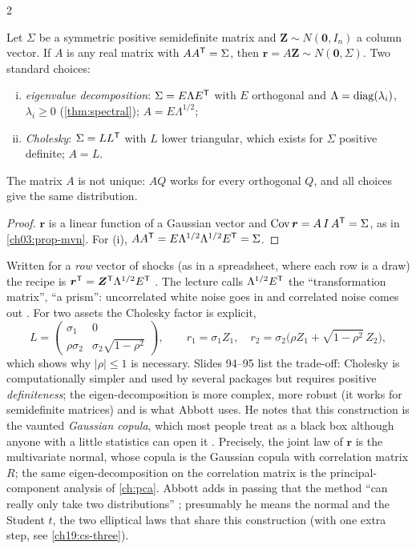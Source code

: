 \begin{paracol}{2}
\begin{proposition}\label{ch19:prop-shocks}
Let $\Sigma$ be a symmetric positive semidefinite matrix and $\bm Z\sim N(\bm0,I_n)$ a column vector. If $A$ is any real matrix with $AA^{\mathsf T}=\Sigma$, then $\bm r=A\bm Z\sim N(\bm 0,\Sigma)$. Two standard choices:
\begin{enumerate}[(i)]
  \item \emph{eigenvalue decomposition}: $\Sigma=E\Lambda E^{\mathsf T}$ with $E$ orthogonal and $\Lambda=\operatorname{diag}(\lambda_i)$, $\lambda_i\ge0$ (\cref{thm:spectral}); $A=E\Lambda^{1/2}$;
  \item \emph{Cholesky}: $\Sigma=LL^{\mathsf T}$ with $L$ lower triangular, which exists for $\Sigma$ positive definite; $A=L$.
\end{enumerate}
The matrix $A$ is not unique: $AQ$ works for every orthogonal $Q$, and all choices give the same distribution.
\end{proposition}
\begin{proof}
$\bm r$ is a linear function of a Gaussian vector and $\operatorname{Cov}\bm r=A\,I\,A^{\mathsf T}=\Sigma$, as in \cref{ch03:prop-mvn}. For (i), $AA^{\mathsf T}=E\Lambda^{1/2}\Lambda^{1/2}E^{\mathsf T}=\Sigma$.
\end{proof}
Written for a \emph{row} vector of shocks (as in a spreadsheet, where each row is a draw) the recipe is $\bm r^{\mathsf T}=\bm Z^{\mathsf T}\Lambda^{1/2}E^{\mathsf T}$ . The lecture calls $\Lambda^{1/2}E^{\mathsf T}$ the ``transformation matrix'', ``a prism'': uncorrelated white noise goes in and correlated noise comes out . For two assets the Cholesky factor is explicit,
\[
  L=\begin{pmatrix}\sigma_1&0\\ \rho\sigma_2&\sigma_2\sqrt{1-\rho^2}\end{pmatrix},\qquad
  r_1=\sigma_1Z_1,\quad r_2=\sigma_2\bigl(\rho Z_1+\sqrt{1-\rho^2}\,Z_2\bigr),
\]
which shows why $|\rho|\le1$ is necessary. Slides 94--95 list the trade-off: Cholesky is computationally simpler and used by several packages but requires positive \emph{definiteness}; the eigen-decomposition is more complex, more robust (it works for semidefinite matrices) and is what Abbott uses. He notes that this construction is the vaunted \emph{Gaussian copula}, which most people treat as a black box although anyone with a little statistics can open it . Precisely, the joint law of $\bm r$ is the multivariate normal, whose copula is the Gaussian copula with correlation matrix $R$; the same eigen-decomposition on the correlation matrix is the principal-component analysis of \cref{ch:pca}. Abbott adds in passing that the method ``can really only take two distributions'' ; presumably he means the normal and the Student $t$, the two elliptical laws that share this construction (with one extra step, see \cref{ch19:cs-three}).


\end{paracol}
